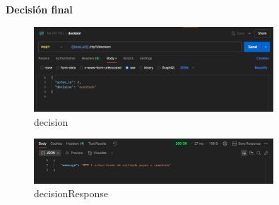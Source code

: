 \item \textbf{Decisión final}
\item 
    \begin{figure}[H]
    \centering
    \includegraphics[width=0.8\textwidth]{Imagenes/decision.png}
    \caption{decision}
    \label{fig:decision}
    \end{figure}

    \begin{figure}[H]
    \centering
    \includegraphics[width=0.8\textwidth]{Imagenes/decisionResponse.png}
    \caption{decisionResponse}
    \label{fig:decisionResponse}
    \end{figure}